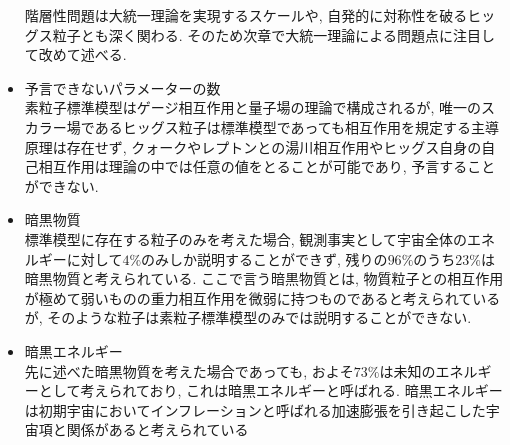 \begin{itemize}
            階層性問題は大統一理論を実現するスケールや, 自発的に対称性を破るヒッグス粒子とも深く関わる.
            そのため次章で大統一理論による問題点に注目して改めて述べる.
      \item 予言できないパラメーターの数\\
            素粒子標準模型はゲージ相互作用と量子場の理論で構成されるが, 唯一のスカラー場であるヒッグス粒子は標準模型であっても相互作用を規定する主導原理は存在せず, クォークやレプトンとの湯川相互作用やヒッグス自身の自己相互作用は理論の中では任意の値をとることが可能であり, 予言することができない.
      \item 暗黒物質\\
            標準模型に存在する粒子のみを考えた場合, 観測事実として宇宙全体のエネルギーに対して$4\%$のみしか説明することができず, 残りの$96\%$のうち$23\%$は暗黒物質と考えられている.
	    ここで言う暗黒物質とは, 物質粒子との相互作用が極めて弱いものの重力相互作用を微弱に持つものであると考えられているが, そのような粒子は素粒子標準模型のみでは説明することができない.
      \item 暗黒エネルギー\\
            先に述べた暗黒物質を考えた場合であっても, およそ$73\%$は未知のエネルギーとして考えられており, これは暗黒エネルギーと呼ばれる.
	    暗黒エネルギーは初期宇宙においてインフレーションと呼ばれる加速膨張を引き起こした宇宙項と関係があると考えられている
\end{itemize}

